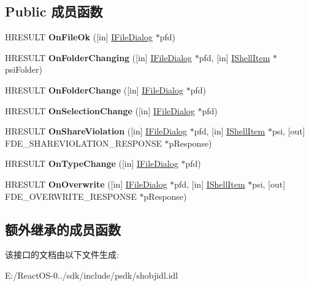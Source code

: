 \subsection*{Public 成员函数}
\begin{DoxyCompactItemize}
\item 
\mbox{\label{interface_i_file_dialog_events_af934a25d38a45aa608962c6c6202f6c5}} 
H\+R\+E\+S\+U\+LT {\bfseries On\+File\+Ok} (\mbox{[}in\mbox{]} \hyperlink{interface_i_file_dialog}{I\+File\+Dialog} $\ast$pfd)
\item 
\mbox{\label{interface_i_file_dialog_events_a30acf55d05bb1f7505b460d2e8d2bd5d}} 
H\+R\+E\+S\+U\+LT {\bfseries On\+Folder\+Changing} (\mbox{[}in\mbox{]} \hyperlink{interface_i_file_dialog}{I\+File\+Dialog} $\ast$pfd, \mbox{[}in\mbox{]} \hyperlink{interface_i_shell_item}{I\+Shell\+Item} $\ast$psi\+Folder)
\item 
\mbox{\label{interface_i_file_dialog_events_a6f97df43699ad054209b7ef6d6efd8dd}} 
H\+R\+E\+S\+U\+LT {\bfseries On\+Folder\+Change} (\mbox{[}in\mbox{]} \hyperlink{interface_i_file_dialog}{I\+File\+Dialog} $\ast$pfd)
\item 
\mbox{\label{interface_i_file_dialog_events_ac0af61fac4e958206ecfa875f3697125}} 
H\+R\+E\+S\+U\+LT {\bfseries On\+Selection\+Change} (\mbox{[}in\mbox{]} \hyperlink{interface_i_file_dialog}{I\+File\+Dialog} $\ast$pfd)
\item 
\mbox{\label{interface_i_file_dialog_events_abc29754cba7f8df34215df077eac1164}} 
H\+R\+E\+S\+U\+LT {\bfseries On\+Share\+Violation} (\mbox{[}in\mbox{]} \hyperlink{interface_i_file_dialog}{I\+File\+Dialog} $\ast$pfd, \mbox{[}in\mbox{]} \hyperlink{interface_i_shell_item}{I\+Shell\+Item} $\ast$psi, \mbox{[}out\mbox{]} F\+D\+E\+\_\+\+S\+H\+A\+R\+E\+V\+I\+O\+L\+A\+T\+I\+O\+N\+\_\+\+R\+E\+S\+P\+O\+N\+SE $\ast$p\+Response)
\item 
\mbox{\label{interface_i_file_dialog_events_a685cf3ec307d21c431062ac068840c7b}} 
H\+R\+E\+S\+U\+LT {\bfseries On\+Type\+Change} (\mbox{[}in\mbox{]} \hyperlink{interface_i_file_dialog}{I\+File\+Dialog} $\ast$pfd)
\item 
\mbox{\label{interface_i_file_dialog_events_ae0bb4e952af6abb91274e3e5d6ef2556}} 
H\+R\+E\+S\+U\+LT {\bfseries On\+Overwrite} (\mbox{[}in\mbox{]} \hyperlink{interface_i_file_dialog}{I\+File\+Dialog} $\ast$pfd, \mbox{[}in\mbox{]} \hyperlink{interface_i_shell_item}{I\+Shell\+Item} $\ast$psi, \mbox{[}out\mbox{]} F\+D\+E\+\_\+\+O\+V\+E\+R\+W\+R\+I\+T\+E\+\_\+\+R\+E\+S\+P\+O\+N\+SE $\ast$p\+Response)
\end{DoxyCompactItemize}
\subsection*{额外继承的成员函数}


该接口的文档由以下文件生成\+:\begin{DoxyCompactItemize}
\item 
E\+:/\+React\+O\+S-\/0../sdk/include/psdk/shobjidl.\+idl\end{DoxyCompactItemize}
